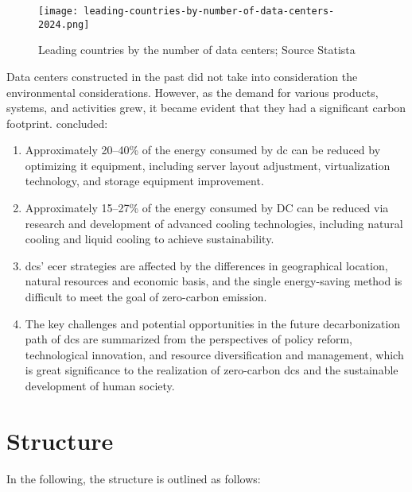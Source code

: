 \documentclass[
  a4paper,  %
  twoside,  %
  bibliography=totoc,
  headsepline,
  cleardoublepage=empty,
  parskip=half,
  draft=false
]{scrbook}
\begin{document}
\begin{figure}
	\centering
	\texttt{[image: leading-countries-by-number-of-data-centers-2024.png]}
	\caption{Leading countries by the number of data centers; Source Statista\cite{statista_2024}}
\end{figure}

Data centers constructed in the past did not take into consideration the environmental considerations. However, as the demand for various products, systems, and activities grew, it became evident that they had a significant carbon footprint. \cite{zhu2023future} concluded:
\begin{enumerate}
	\item Approximately 20–40\% of the energy consumed by \gls{dc} can be reduced by optimizing \gls{it} equipment, including server layout adjustment, virtualization technology, and storage equipment improvement.
	\item Approximately 15–27\% of the energy consumed by DC can be reduced via research and development of advanced cooling technologies, including natural cooling and liquid cooling to achieve sustainability.
	\item \gls{dc}s' \gls{ecer} strategies are affected by the differences in geographical location, natural resources and economic basis, and the single energy-saving method is difficult to meet the goal of zero-carbon emission.
	\item The key challenges and potential opportunities in the future decarbonization path of \gls{dc}s are summarized from the perspectives of policy reform, technological innovation, and resource diversification and management, which is great significance to the realization of zero-carbon \gls{dc}s and the sustainable development of human society.
\end{enumerate}



\section{Structure}

In the following, the structure is outlined as follows:
\end{document}

